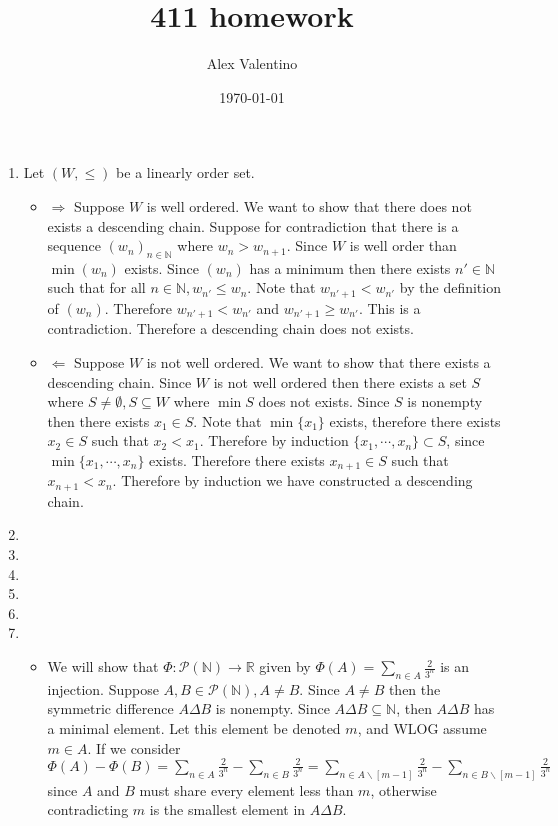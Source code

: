 \documentclass[12pt, letterpaper]{article}
\date{\today}
\author{Alex Valentino}
\title{411 homework}
\newcommand{\N}{\mathbb{N}}
\newcommand{\R}{\mathbb{R}}
\newcommand{\Po}{\mathcal{P}}
\begin{document}
\begin{enumerate}
	\item Let $(W,\leq)$ be a linearly order set.  
	\begin{itemize}
		\item  $\Rightarrow$ Suppose $W$ is well ordered.  We want to show that there does not 
		exists a descending chain.  Suppose for contradiction that there is a sequence $(w_n)_{n \in \N}$ where $w_n > w_{n+1}$.  Since $W$ is well order than 
		$\min (w_n)$ exists.  Since $(w_n)$ has a minimum then there exists 
		$n' \in \N$ such that for all $n \in \N, w_{n'} \leq w_n$.  Note that 
		$w_{n'+1} < w_{n'}$ by the definition of $(w_n)$.  Therefore $w_{n'+1} < w_{n'}$ and $w_{n'+1} \geq w_{n'}$.  This is a contradiction.  Therefore a descending chain does not exists.  
		\item $\Leftarrow$ Suppose $W$ is not well ordered.  We want to show that there exists 
		a descending chain.  Since $W$ is not well ordered then there exists a set
		$S$ where $S \neq \emptyset, S \subseteq W$ where $\min S$ does not exists.  Since $S$ is nonempty then there exists $x_1 \in S$.  Note that $\min \{x_1\}$ exists, therefore there exists $x_2 \in S$ such that $x_2 < x_1$.  Therefore by induction $\{x_1,\cdots,x_n\} \subset S$, since $\min \{x_1,\cdots,x_n\}$ exists.  Therefore there exists $x_{n+1} \in S$ such that $x_{n+1} < x_n$.  Therefore by induction we have constructed a descending chain.  
	\end{itemize}
	\item 
	\item 
	\item 
	\item 
	\item 
	\item 
	\begin{itemize}
		\item We will show that $\Phi: \Po(\N) \to \R$ given by $\Phi(A) = \sum_{n \in A} \frac{2}{3^n}$ is an injection.
		Suppose $A,B \in \Po(\N), A\neq B$.  Since $A \neq B$ then the symmetric difference $A \Delta B$ is nonempty.  
		Since $A \Delta B \subseteq \N$, then $A \Delta B$ has a minimal element.  Let this element be denoted $m$, and 
		WLOG assume $m \in A$.  If we consider $\Phi(A) - \Phi(B) = \sum_{n \in A} \frac{2}{3^n}-\sum_{n \in B} \frac{2}{3^n} = \sum_{n \in A\backslash [m-1]} \frac{2}{3^n} - \sum_{n \in B\backslash [m-1]} \frac{2}{3^n}$ since $A$ and $B$
		must share every element less than $m$, otherwise contradicting $m$ is the smallest element in $A \Delta B$.

\end{itemize}
\end{enumerate}
\end{document}
